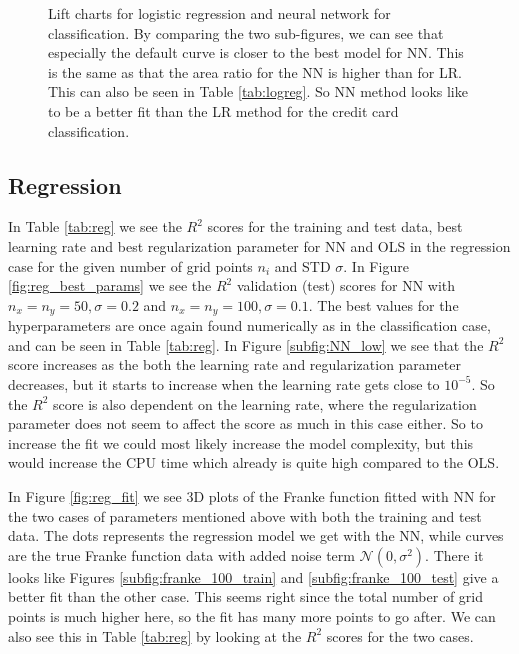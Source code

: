 \documentclass[12pt,a4paper,english]{article}
\begin{document}
\begin{figure}[t!]
	\hspace{0.5em}
	\caption{Lift charts for logistic regression and neural network for classification. By comparing the two sub-figures, we can see that especially the default curve is closer to the best model for NN. This is the same as that the area ratio for the NN is higher than for LR. This can also be seen in Table \ref{tab:logreg}. So NN method looks like to be a better fit than the LR method for the credit card classification.\label{fig:class_lift_charts}}
\end{figure}

\subsection{Regression}
\label{subsect:result_reg}
In Table \ref{tab:reg} we see the $R^2$ scores for the training and test data, best learning rate and best regularization parameter for NN and OLS in the regression case for the given number of grid points $n_i$ and STD $\sigma$. In Figure \ref{fig:reg_best_params} we see the $R^2$ validation (test) scores for NN with $n_x=n_y=50, \sigma=0.2$ and $n_x=n_y=100,\sigma=0.1$. The best values for the hyperparameters are once again found numerically as in the classification case, and can be seen in Table \ref{tab:reg}. In Figure \ref{subfig:NN_low} we see that the $R^2$ score increases as the both the learning rate and regularization parameter decreases, but it starts to increase when the learning rate gets close to $10^{-5}$. So the $R^2$ score is also dependent on the learning rate, where the regularization parameter does not seem to affect the score as much in this case either. So to increase the fit we could most likely increase the model complexity, but this would increase the CPU time which already is quite high compared to the OLS.

In Figure \ref{fig:reg_fit} we see 3D plots of the Franke function fitted with NN for the two cases of parameters mentioned above with both the training and test data. The dots represents the regression model we get with the NN, while curves are the true Franke function data with added noise term $\mathcal{N}(0,\sigma^2)$. There it looks like Figures \ref{subfig:franke_100_train} and \ref{subfig:franke_100_test} give a better fit than the other case. This seems right since the total number of grid points is much higher here, so the fit has many more points to go after. We can also see this in Table \ref{tab:reg} by looking at the $R^2$ scores for the two cases.
\end{document}
